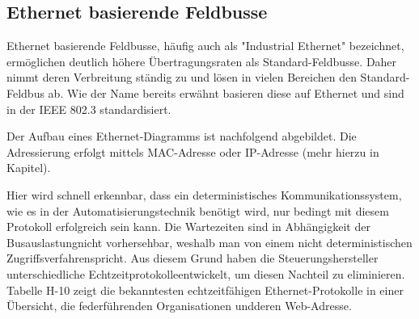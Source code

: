 \documentclass[ a4paper,
                oneside,
                toc=bibliography,
                toc=listof
                ]{scrbook}
\begin{document}
	\subsection{Ethernet basierende Feldbusse}
	Ethernet basierende Feldbusse, häufig auch als "Industrial Ethernet" bezeichnet, ermöglichen deutlich höhere Übertragungsraten als Standard-Feldbusse. Daher nimmt deren Verbreitung ständig zu und lösen in vielen Bereichen den Standard-Feldbus ab. Wie der Name bereits erwähnt basieren diese auf Ethernet und sind in der IEEE 802.3 standardisiert.
	
	Der Aufbau eines Ethernet-Diagramms ist nachfolgend abgebildet. Die Adressierung erfolgt mittels MAC-Adresse oder IP-Adresse (mehr hierzu in Kapitel).
	
	Hier wird schnell erkennbar, dass ein deterministisches Kommunikationssystem,
	wie es in der Automatisierungstechnik benötigt wird, nur bedingt mit diesem Protokoll erfolgreich sein kann. Die Wartezeiten sind in Abhängigkeit der Busauslastungnicht vorhersehbar, weshalb man von einem nicht deterministischen Zugriffsverfahrenspricht.
	Aus diesem Grund haben die Steuerungshersteller unterschiedliche Echtzeitprotokolleentwickelt, um diesen Nachteil zu eliminieren. Tabelle H-10 zeigt die bekanntesten echtzeitfähigen Ethernet-Protokolle in einer Übersicht, die federführenden Organisationen undderen Web-Adresse.
	
\end{document}
